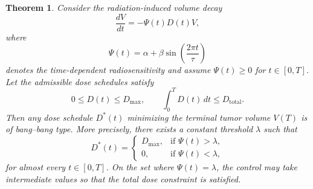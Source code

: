 \documentclass[10pt,a4paper]{amsart}
\newtheorem{theorem}{Theorem}
\begin{document}
 \begin{theorem}\label{thm:rt}
Consider the radiation-induced volume decay
\[
\frac{dV}{dt} = -\Psi(t)D(t)V,
\]
where
\[
\Psi(t) = \alpha + \beta \sin\!\left(\frac{2\pi t}{\tau}\right)
\]
denotes the time-dependent radiosensitivity and assume $\Psi(t)\ge0$ for $t\in[0,T]$. Let the admissible dose schedules satisfy
\[
0 \le D(t) \le D_{\max}, 
\qquad 
\int_0^T D(t)\,dt \le D_{\mathrm{total}}.
\]
Then any dose schedule $D^*(t)$ minimizing the terminal tumor volume $V(T)$ is of bang--bang type. More precisely, there exists a constant threshold $\lambda$ such that
\[
D^*(t) =
\begin{cases}
D_{\max}, & \text{if } \Psi(t) > \lambda,\\[2mm]
0, & \text{if } \Psi(t) < \lambda,
\end{cases}
\]
for almost every $t\in[0,T]$. On the set where $\Psi(t)=\lambda$, the control may take intermediate values so that the total dose
constraint is satisfied.
\end{theorem}
\end{document}

